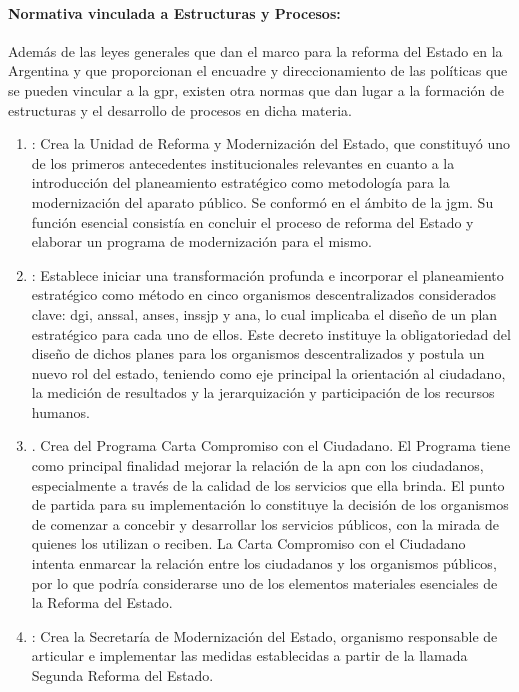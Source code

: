 \paragraph{Normativa vinculada a Estructuras y Procesos:}
Además de las leyes generales que dan el marco para la reforma del Estado en la Argentina y que proporcionan el encuadre y direccionamiento de las políticas que se pueden vincular a la \ac{gpr}, existen otra normas que dan lugar a la formación de estructuras y el desarrollo de procesos en dicha materia.

    \begin{enumerate}
        \item \textcite{decreto558}: Crea la Unidad de Reforma y Modernización del Estado, que constituyó uno de los primeros antecedentes institucionales relevantes en cuanto a la introducción del planeamiento estratégico como metodología para la modernización del aparato público. Se conformó en el ámbito de la \ac{jgm}. Su función esencial consistía en concluir el proceso de reforma del Estado y elaborar un programa de modernización para el mismo.
        \item \textcite{decreto928}: Establece iniciar una transformación profunda e incorporar el planeamiento estratégico como método en cinco organismos descentralizados considerados clave: \acs{dgi}, \acs{anssal}, \acs{anses}, \acs{inssjp} y \acs{ana}, lo cual implicaba el diseño de un plan estratégico para cada uno de ellos. Este decreto instituye la obligatoriedad del diseño de dichos planes para los organismos descentralizados y postula un nuevo rol del estado, teniendo como eje principal la orientación al ciudadano, la medición de resultados y la jerarquización y participación de los recursos humanos.
        \item \textcite{decreto229}. Crea del Programa Carta Compromiso con el Ciudadano. El Programa tiene como principal finalidad mejorar la relación de la \ac{apn} con los ciudadanos, especialmente a través de la calidad de los servicios que ella brinda. El punto de partida para su implementación lo constituye la decisión de los organismos de comenzar a concebir y desarrollar los servicios públicos, con la mirada de quienes los utilizan o reciben. La Carta Compromiso con el Ciudadano intenta enmarcar la relación entre los ciudadanos y los organismos públicos, por lo que podría considerarse uno de los elementos materiales esenciales de la Reforma del Estado.
        \item \textcite{decreto673}: Crea la Secretaría de Modernización del Estado, organismo responsable de articular e implementar las medidas establecidas a partir de la llamada Segunda Reforma del Estado.

\end{enumerate}
